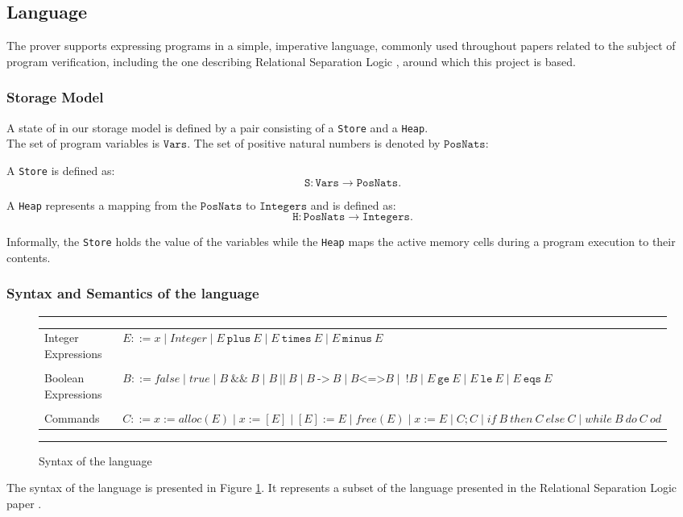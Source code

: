 \documentclass[12pt,a4paper]{article}
\begin{document}
\subsection{Language}
The prover supports expressing programs in a simple, imperative language, commonly used throughout papers  \cite{primer} \cite{SeparationLogic} related to the subject of program verification, including the one describing Relational Separation Logic \cite{relational}, around  which this project is based. 
\subsubsection{Storage Model}
A state of in our storage model is defined by a pair consisting of a \texttt{Store} and a \texttt{Heap}.
\\
The set of program variables is \(\mathtt{Vars}\). The set of positive natural numbers is denoted by \(\mathtt{PosNats}\): 
\begin{flushleft}
A \texttt{Store} is defined as:
\[ \mathtt{S} : \mathtt{Vars} \rightarrow \mathtt{PosNats} .\]

A \texttt{Heap} represents a mapping from the \(\mathtt{PosNats}\) to \(\mathtt{Integers}\) and is defined as:
\[ \mathtt{H} : \mathtt{PosNats} \rightarrow \mathtt{Integers} .\] 
\end{flushleft}
Informally, the \texttt{Store} holds the value of the variables while the \texttt{Heap} maps the active memory cells during a program execution to their contents.
\subsubsection{Syntax and Semantics of the language}
\begin{figure}[h]
	\noindent\rule{\linewidth}{0.4pt}
	\begin{tabularx}{\linewidth}{l  X}
		Integer Expressions& \(E ::= x \mid \textit{Integer} \mid E\ \mathtt{plus}\ E \mid E\ \mathtt{times}\ E \mid E\ \mathtt{minus}\ E \) \\
		\\
		Boolean Expressions& \(B ::= \textit{false} \mid \textit{true} \mid B\ \mathtt{\&\&}\ B \mid  B\ ||\ B \mid B\  \texttt{->}\ B \mid B \texttt{<=>} B \mid \ ! B \mid E\ \mathtt{ge}\ E \mid E\ \mathtt{le}\ E \mid E\ \mathtt{eqs}\ E \)\\
		\\ 	
		Commands& \(C ::= x := alloc(E) \mid x := [E] \mid [E] := E \mid free(E) \mid x := E \mid C;C \mid if\ B\ then\ C\ else\ C \mid while\ B\ do\ C\ od \) \\
	\end{tabularx}
	\caption{Syntax of the language}
	\label{fig:langSyntax}
	\noindent\rule{\linewidth}{0.4pt}
\end{figure}
The syntax of the language is presented in Figure \ref{fig:langSyntax}. It represents a subset of the language presented in the Relational Separation Logic paper \cite{relational}. 
\end{document}
